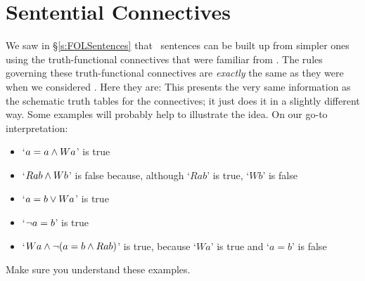 \section{Sentential Connectives}\label{fol.truth.sent}
We saw in §\ref{s:FOLSentences} that \FOL\ sentences can be built up from simpler ones using the truth-functional connectives that were familiar from \TFL. The rules governing these truth-functional connectives are \emph{exactly} the same as they were when we considered \TFL. Here they are:
This presents the very same information as the schematic truth tables for the connectives; it just does it in a slightly different way. Some examples will probably help to illustrate the idea. On our go-to interpretation:
	\begin{itemize}
		\item `$a = a \wedge Wa$' is true
		\item `$Rab \wedge Wb$' is false because, although `$Rab$' is true, `$Wb$' is false
		\item `$a = b \vee Wa$' is true
		\item `$\neg a = b$' is true
		\item `$Wa \wedge \neg( a= b \wedge Rab)$' is true, because `$Wa$' is true and `$a = b$' is false
	\end{itemize}
Make sure you understand these examples.

